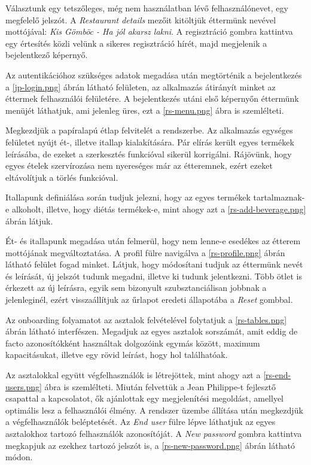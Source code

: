 Választunk egy tetszőleges, még nem használatban lévő felhasználónevet, egy megfelelő jelszót. A \emph{Restaurant details} mezőit kitöltjük éttermünk nevével mottójával: \emph{Kis Gömböc - Ha jól akarsz lakni}. A regisztráció gombra kattintva egy értesítés közli velünk a sikeres regisztráció hírét, majd megjelenik a bejelentkező képernyő.


Az autentikációhoz szükséges adatok megadása után megtörténik a bejelentkezés a \ref{jp-login.png} ábrán látható felületen, az alkalmazás átirányít minket az éttermek felhasználói felületére. A bejelentkezés utáni első képernyőn éttermünk menüjét láthatjuk, ami jelenleg üres, ezt a \ref{rs-menu.png} ábra is szemlélteti.

Megkezdjük a papíralapú étlap felvitelét a rendszerbe. Az alkalmazás egységes felületet nyújt ét-, illetve itallap kialakítására. Pár elírás került egyes termékek leírásába, de ezeket a szerkesztés funkcióval sikerül korrigálni. Rájövünk, hogy egyes ételek szervírozása nem nyereséges már az étteremnek, ezért ezeket eltávolítjuk a törlés funkcióval.


Itallapunk definiálása során tudjuk jelezni, hogy az egyes termékek tartalmaznak-e alkoholt, illetve, hogy diétás termékek-e, mint ahogy azt a \ref{rs-add-beverage.png} ábrán látjuk.

Ét- és itallapunk megadása után felmerül, hogy nem lenne-e esedékes az étterem mottójának megváltoztatása. A profil fülre navigálva a \ref{rs-profile.png} ábrán látható felület fogad minket. Látjuk, hogy módosítani tudjuk az éttermünk nevét és leírását, új jelszót tudunk megadni, illetve ki tudunk jelentkezni. Több ötlet is érkezett az új leírásra, egyik sem bizonyult szubsztanciálisan jobbnak a jelenleginél, ezért visszaállítjuk az űrlapot eredeti állapotába a \emph{Reset} gombbal.

Az onboarding folyamatot az asztalok felvételével folytatjuk a \ref{rs-tables.png} ábrán látható interfészen. Megadjuk az egyes asztalok sorszámát, amit eddig de facto azonosítókként használtak dolgozóink egymás között, maximum kapacitásukat, illetve egy rövid leírást, hogy hol találhatóak.


Az asztalokkal együtt végfelhasználók is létrejöttek, mint ahogy azt a \ref{rs-end-users.png} ábra is szemlélteti. Miután felvettük a Jean Philippe-t fejlesztő csapattal a kapcsolatot, ők ajánlottak egy megjelenítési megoldást, amellyel optimális lesz a felhasználói élmény. A rendszer üzembe állítása után megkezdjük a végfelhasználók beléptetését. Az \emph{End user} fülre lépve láthatjuk az egyes asztalokhoz tartozó felhasználók azonosítóját. A \emph{New password} gombra kattintva megkapjuk az ezekhez tartozó jelszót is, a \ref{rs-new-password.png} ábrán látható módon.


